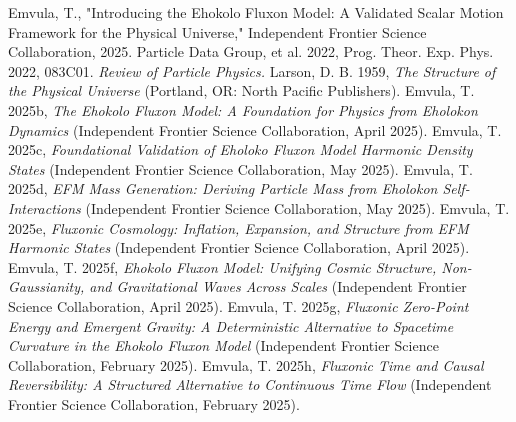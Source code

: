 \documentclass[11pt]{article}
\begin{document}
\begin{thebibliography}{9}
\raggedright
{} Emvula, T., "Introducing the Ehokolo Fluxon Model: A Validated Scalar Motion Framework for the Physical Universe," Independent Frontier Science Collaboration, 2025.
 Particle Data Group, et al. 2022, Prog. Theor. Exp. Phys. 2022, 083C01.
\textit{Review of Particle Physics.}
 Larson, D. B. 1959, \textit{The Structure of the Physical Universe} (Portland, OR: North Pacific Publishers).
 Emvula, T. 2025b, \textit{The Ehokolo Fluxon Model: A Foundation for Physics from Eholokon Dynamics} (Independent Frontier Science Collaboration, April 2025).
 Emvula, T. 2025c, \textit{Foundational Validation of Eholoko Fluxon Model Harmonic Density States} (Independent Frontier Science Collaboration, May 2025).
 Emvula, T. 2025d, \textit{EFM Mass Generation: Deriving Particle Mass from Eholokon Self-Interactions} (Independent Frontier Science Collaboration, May 2025).
 Emvula, T. 2025e, \textit{Fluxonic Cosmology: Inflation, Expansion, and Structure from EFM Harmonic States} (Independent Frontier Science Collaboration, April 2025).
 Emvula, T. 2025f, \textit{Ehokolo Fluxon Model: Unifying Cosmic Structure, Non-Gaussianity, and Gravitational Waves Across Scales} (Independent Frontier Science Collaboration, April 2025).
 Emvula, T. 2025g, \textit{Fluxonic Zero-Point Energy and Emergent Gravity: A Deterministic Alternative to Spacetime Curvature in the Ehokolo Fluxon Model} (Independent Frontier Science Collaboration, February 2025).
 Emvula, T. 2025h, \textit{Fluxonic Time and Causal Reversibility: A Structured Alternative to Continuous Time Flow} (Independent Frontier Science Collaboration, February 2025).
\end{thebibliography}
\end{document}
